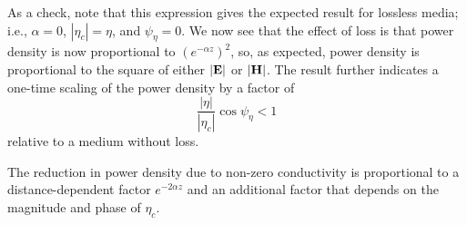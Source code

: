 As a check, note that this expression gives the expected result for lossless media; i.e., $\alpha=0$, $\left|\eta_c\right|=\eta$, and $\psi_{\eta}=0$.
We now see that the effect of loss is that power density is now proportional to $\left(e^{-\alpha z}\right)^2$, so, as expected, power density is proportional to the square of either $\left|{\bf E}\right|$ or $\left|{\bf H}\right|$.
The result further indicates a one-time scaling of the power density by a factor of 
%
\begin{equation}
\frac{\left|\eta\right|}{\left|\eta_c\right|}\cos\psi_{\eta} < 1
\end{equation}
%
relative to a medium without loss.

\begin{mdframed}[backgroundcolor=yellow!20,nobreak=true] 
The reduction in power density due to non-zero conductivity is proportional to a distance-dependent factor $e^{-2\alpha z}$ and an additional factor that depends on the magnitude and phase of $\eta_c$. 
\end{mdframed}


